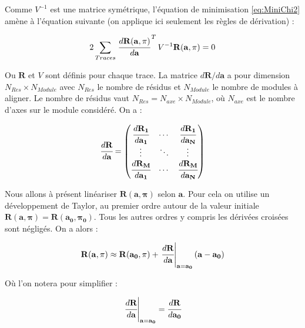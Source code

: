    \medskip
   
   Comme $V^{-1}$ est une matrice sym\'etrique, l'équation de minimisation \ref{eq:MiniChi2} am\`ene \`a l'\'equation suivante (on applique ici seulement les r\`egles de d\'erivation) :
 
   \begin{equation}
    2 \sum_{Traces} \left. \cfrac{ d \mathbf{ R(\mathbf{a},\mathbf{\pi})} }{d \mathbf{a}} \right.^T V^{-1} \mathbf{R(\mathbf{a},\mathbf{\pi})} = 0
    \label{eq:mini_chi2}
   \end{equation}

   Ou $\mathbf{R}$ et $V$ sont d\'efinis pour chaque trace. La matrice $ d \mathbf{R}/d \mathbf{a}$ a pour dimension $N_{Res} \times N_{Module}$ avec $N_{Res}$ le nombre de r\'esidus et $N_{Module}$ le nombre de modules \`a aligner. Le nombre de r\'esidus vaut $N_{Res} = N_{axe} \times N_{Module}$, o\`u $N_{axe}$ est le nombre d'axes sur le module consid\'er\'e. On a :
   
   \begin{equation}
   \cfrac{ d \mathbf{R}}{d \mathbf{a}} =  \begin{pmatrix} \cfrac{ d \mathbf{R_1}}{d \mathbf{a_1}} & \cdots &  \cfrac{ d \mathbf{R_1}}{d \mathbf{a_N}} \\ \vdots &  \ddots &  \vdots \\ \cfrac{ d \mathbf{R_M}}{d \mathbf{a_1}} & \cdots &  \cfrac{ d \mathbf{R_M}}{d \mathbf{a_N}} \end{pmatrix}
   \end{equation}

   \medskip
   
   Nous allons \`a pr\'esent lin\'eariser $\mathbf{R}(\mathbf{a},\mathbf{\pi})$ selon $\textbf{a}$. Pour cela on utilise un développement de Taylor, au premier ordre autour de la valeur initiale $\mathbf{R}(\mathbf{a},\mathbf{\pi}) = \mathbf{R}(\mathbf{a_0},\mathbf{\pi_0})$. Tous les autres ordres y compris les d\'eriv\'ees crois\'ees sont n\'eglig\'es. On a alors :
   
   \begin{equation}
    \mathbf{R}(\mathbf{a},\mathbf{\pi}) \approx \mathbf{R}(\mathbf{a_0},\mathbf{\pi}) + \left. \cfrac{ d \mathbf{R}}{d \mathbf{a}} \right|_{\mathbf{a}=\mathbf{a_0}} (\mathbf{a}-\mathbf{a_0})
    \label{eq:lin_a}
   \end{equation}

   O\`u l'on notera pour simplifier :
   
   \begin{equation}
    \left. \cfrac{ d \mathbf{R}}{d \mathbf{a}}\right|_{\mathbf{a}=\mathbf{a_0}} = \cfrac{ d \mathbf{R}}{d \mathbf{a_0}}
   \end{equation}
   
